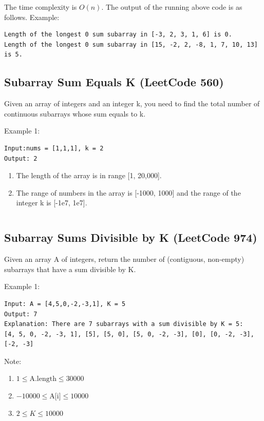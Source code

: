 \documentclass[11pt]{article}
\begin{document}
\inputminted[breaklines=true,frame=leftline, linenos=true]{python}{src/findLongestSubarraySum0.py}

The time complexity is $O(n)$.
The output of the running above code is as follows. 
Example:
\begin{verbatim}
Length of the longest 0 sum subarray in [-3, 2, 3, 1, 6] is 0.
Length of the longest 0 sum subarray in [15, -2, 2, -8, 1, 7, 10, 13] is 5.
\end{verbatim}

\subsection{Subarray Sum Equals K (LeetCode 560)}
Given an array of integers and an integer k, you need to find the total number of continuous subarrays whose sum equals to k.

Example 1:
\begin{verbatim}
Input:nums = [1,1,1], k = 2
Output: 2	
\end{verbatim}

\begin{enumerate} 
\item The length of the array is in range [1, 20,000].
\item The range of numbers in the array is [-1000, 1000] and the range of the integer k is [-1e7, 1e7].	
\end{enumerate}

\inputminted[breaklines=true,frame=leftline, linenos=true]{python}{src/subarraySum.py}

\subsection{Subarray Sums Divisible by K (LeetCode 974)}
Given an array A of integers, return the number of (contiguous, non-empty) subarrays that have a sum divisible by K.

Example 1:
\begin{verbatim}
Input: A = [4,5,0,-2,-3,1], K = 5
Output: 7
Explanation: There are 7 subarrays with a sum divisible by K = 5:
[4, 5, 0, -2, -3, 1], [5], [5, 0], [5, 0, -2, -3], [0], [0, -2, -3], [-2, -3]
\end{verbatim}


Note:
\begin{enumerate}
	\item $1 \leq \text{A.length} \leq 30000$
	\item $-10000 \leq \text{A[i]} \leq 10000$
	\item $2 \leq K \leq 10000$
\end{enumerate}
\end{document}
